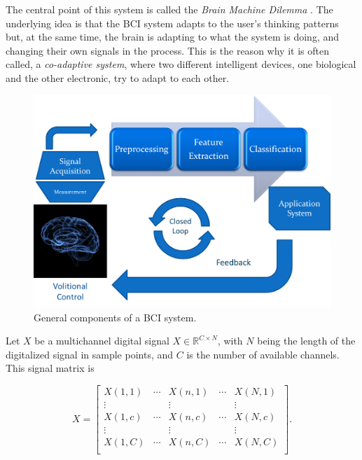 The central point of this system is called the \textit{Brain Machine Dilemma} \cite{WolpawJonathanR2012}.  The underlying idea is that the BCI system adapts to the user's thinking patterns but, at the same time, the brain is adapting to what the system is doing, and changing their own signals in the process.  This is the reason why it is often called, a \textit{co-adaptive system}, where two different intelligent devices, one biological and the other electronic, try to adapt to each other.

\begin{figure}[]
\centering
\includegraphics[scale=0.5]{images/bcichart.png}
\caption[BCI Block Diagram]{General components of a BCI system.}
\label{fig:bciblockdiagram}
\end{figure}

\vspace{5pt}

Let $X$ be a multichannel digital signal $X \in \mathbb{R}^{C \times N}$,  with $N$ being the length of the digitalized signal in sample points, and $C$ is the number of available channels.  This signal matrix is 

\begin{equation}
X = \left[
\begin{matrix} 
X(1,1)  & \cdots & X(n,1) & \cdots & X(N,1) \\
\vdots &             & \vdots &            & \vdots \\
X(1,c)  & \cdots & X(n,c) & \cdots & X(N,c) \\
\vdots &             & \vdots &            & \vdots \\
X(1,C)  & \cdots & X(n,C) & \cdots & X(N,C) \\
\end{matrix}
\right]   .
\end{equation}

